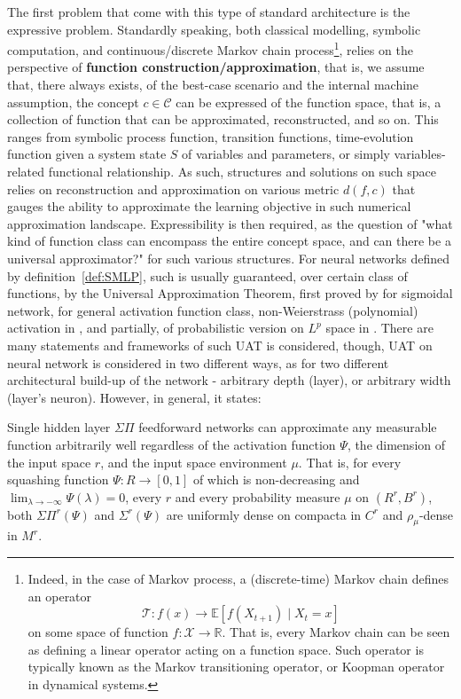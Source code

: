 The first problem that come with this type of standard architecture is the expressive problem. Standardly speaking, both classical modelling, symbolic computation, and continuous/discrete Markov chain process\footnote{Indeed, in the case of Markov process, a (discrete-time) Markov chain defines an operator \begin{equation*}
    \mathcal{T}: f(x) \to \mathbb{E}[f(X_{t+1})\mid X_{t}=x]
\end{equation*} on some space of function $f:\mathcal{X}\to\mathbb{R}$. That is, every Markov chain can be seen as defining a linear operator acting on a function space. Such operator is typically known as the Markov transitioning operator, or Koopman operator in dynamical systems.}, relies on the perspective of \textbf{function construction/approximation}, that is, we assume that, there always exists, of the best-case scenario and the internal machine assumption, the concept $c\in\mathcal{C}$ can be expressed of the function space, that is, a collection of function that can be approximated, reconstructed, and so on. This ranges from symbolic process function, transition functions, time-evolution function given a system state $S$ of variables and parameters, or simply variables-related functional relationship. As such, structures and solutions on such space relies on reconstruction and approximation on various metric $d(f,c)$ that gauges the ability to approximate the learning objective in such numerical approximation landscape. Expressibility is then required, as the question of "what kind of function class can encompass the entire concept space, and can there be a universal approximator?" for such various structures. For neural networks defined by definition~\ref{def:SMLP}, such is usually guaranteed, over certain class of functions, by the Universal Approximation Theorem, first proved by \cite{cybenko1989approximation} for sigmoidal network, \cite{hornik1989multilayer} for general activation function class, non-Weierstrass (polynomial) activation in \cite{leshno1993multilayer}, and partially, of probabilistic version on $L^{p}$ space in \cite{hornik1991approximation}. There are many statements and frameworks of such UAT is considered, though, UAT on neural network is considered in two different ways, as for two different architectural build-up of the network - arbitrary depth (layer), or arbitrary width (layer's neuron). However, in general, it states:

\begin{theorem}
    Single hidden layer $\Sigma\Pi$ feedforward networks can approximate any measurable function arbitrarily well regardless of the activation function $\Psi$, the dimension of the input space $r$, and the input space environment $\mu$. That is, for every squashing function $\Psi:R\to[0,1]$ of which is non-decreasing and $\lim_{\lambda\to-\infty}\Psi(\lambda)=0$, every $r$ and every probability measure $\mu$ on $(R^{r},B^{r})$, both $\Sigma\Pi^{r}(\Psi)$ and $\Sigma^{r}(\Psi)$ are uniformly dense on compacta in $C^{r}$ and $\rho_{\mu}$-dense in $M^{r}$. 
\end{theorem}

